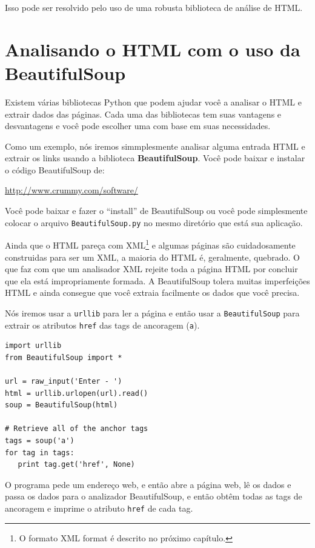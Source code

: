 Isso pode ser resolvido pelo uso de uma robusta biblioteca de análise
de HTML.

\section{Analisando o HTML com o uso da BeautifulSoup}

Existem várias bibliotecas Python que podem ajudar você a analisar
o HTML e extrair dados das páginas.  Cada uma das bibliotecas
tem suas vantagens e desvantagens e você pode escolher uma com base
em suas necessidades.

Como um exemplo, nós iremos simmplesmente analisar alguma entrada HTML 
e extrair os links usando a biblioteca {\bf BeautifulSoup}.   
Você pode baixar e instalar o código BeautifulSoup de:

\url{http://www.crummy.com/software/}

Você pode baixar e fazer o ``install'' de BeautifulSoup ou você 
pode simplesmente colocar o arquivo {\tt BeautifulSoup.py} no mesmo
diretório que está sua aplicação.

Ainda que o HTML pareça com XML\footnote{O formato XML format é
descrito no próximo capítulo.} e algumas páginas são cuidadosamente 
construidas para ser um XML, a maioria do HTML é, geralmente, quebrado.
O que faz com que um analisador XML rejeite toda a página HTML por
concluir que ela está impropriamente formada.  A BeautifulSoup tolera
muitas imperfeições HTML e ainda consegue que você extraia facilmente
os dados que você precisa.

Nós iremos usar a {\tt urllib} para ler a página e então usar a
{\tt BeautifulSoup} para extrair os atributos {\tt href} das tags
de ancoragem ({\tt a}).

\beforeverb
\begin{verbatim}
import urllib
from BeautifulSoup import *

url = raw_input('Enter - ')
html = urllib.urlopen(url).read()
soup = BeautifulSoup(html)

# Retrieve all of the anchor tags
tags = soup('a')
for tag in tags:
   print tag.get('href', None)
\end{verbatim}
\afterverb
%
O programa pede um endereço web, e então abre a página web,
lê os dados e passa os dados para o analizador BeautifulSoup, 
e então obtêm todas as tags de ancoragem e imprime o atributo
{\tt href} de cada tag.

